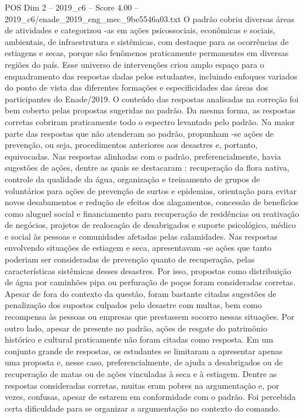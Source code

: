 \begin{textsample}{POS Dim 2 – 2019\_c6 – Score 4.00 – 2019\_c6/enade\_2019\_eng\_mec\_9be5546a03.txt}
O padrão cobriu diversas áreas de atividades e categorizou -as em ações psicossociais, econômicas e sociais, ambientais, de infraestrutura e sistêmicas, com destaque para as ocorrências de estiagens e secas, porque são fenômenos praticamente permanentes em diversas regiões do país.
Esse universo de intervenções criou amplo espaço para o enquadramento das respostas dadas pelos estudantes, incluindo enfoques variados do ponto de vista das diferentes formações e especificidades das áreas dos participantes do Enade/2019.
O conteúdo das respostas analisadas na correção foi bem coberto pelas propostas sugeridas no padrão.
Da mesma forma, as respostas corretas cobriram praticamente todo o espectro levantado pelo padrão.
Na maior parte das respostas que não atenderam ao padrão, propunham -se ações de prevenção, ou seja, procedimentos anteriores aos desastres e, portanto, equivocadas.
Nas respostas alinhadas com o padrão, preferencialmente, havia sugestões de ações, dentre as quais se destacaram : recuperação da flora nativa, controle da qualidade da água, organização e treinamento de grupos de voluntários para ações de prevenção de surtos e epidemias, orientação para evitar novos desabamentos e redução de efeitos dos alagamentos, concessão de benefícios como aluguel social e financiamento para recuperação de residências ou reativação de negócios, projetos de realocação de desabrigados e suporte psicológico, médico e social às pessoas e comunidades afetadas pelas calamidades.
Nas respostas envolvendo situações de estiagem e seca, apresentavam -se ações que tanto poderiam ser consideradas de prevenção quanto de recuperação, pelas características sistêmicas desses desastres.
Por isso, propostas como distribuição de água por caminhões pipa ou perfuração de poços foram consideradas corretas.
Apesar de fora do contexto da questão, foram bastante citadas sugestões de penalização dos supostos culpados pelo desastre com multas, bem como recompensa às pessoas ou empresas que prestassem socorro nessas situações.
Por outro lado, apesar de presente no padrão, ações de resgate do patrimônio histórico e cultural praticamente não foram citadas como resposta.
Em um conjunto grande de respostas, os estudantes se limitaram a apresentar apenas uma proposta e, nesse caso, preferencialmente, de ajuda a desabrigados ou de recuperação de matas ou de ações vinculadas à seca e à estiagem.
Dentre as respostas consideradas corretas, muitas eram pobres na argumentação e, por vezes, confusas, apesar de estarem em conformidade com o padrão.
Foi percebida certa dificuldade para se organizar a argumentação no contexto do comando.

\end{textsample}
